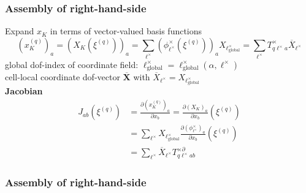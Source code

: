 \documentclass{beamer}
\begin{document}

\begin{frame}
  \frametitle{Assembly of right-hand-side}
  Expand $x_K$ in terms of vector-valued basis functions
$$
(x_K^{(q)})_a = (X_K(\xi^{(q)}))_a = \sum_{\ell^\times} (\phi^\times_{\ell^\times}(\xi^{(q)}))_a X_{\ell^\times_{\text{global}}} = \sum_{\ell^\times} T^\times_{q\ell^\times a} \overline{X}_{\ell^\times}
$$
global dof-index of coordinate field: $\ell^\times_{\text{global}}=\ell_{\text{global}}^\times(\alpha,\ell^\times)$\\
cell-local coordinate dof-vector $\overline{\boldsymbol{X}}$ with $\overline{X}_{\ell^\times} = X_{\ell_{\text{global}}^\times}$\\[2ex]
\textbf{Jacobian}
$$
\begin{aligned}
J_{ab}(\xi^{(q)}) &= \frac{\partial (x_K^{(q)})_a }{\partial x_b} = \frac{\partial (X_K)_a }{\partial x_b}(\xi^{(q)})\\
&= \sum_{\ell^\times} X_{\ell^\times_{\text{global}}} \frac{\partial (\phi^\times_{\ell^\times})_a }{\partial x_b}(\xi^{(q)})\\
&= \sum_{\ell^\times} \overline{X}_{\ell^\times} T^{\times\partial}_{q\ell^\times ab}
\end{aligned}
$$

\end{frame}


\begin{frame}
  \frametitle{Assembly of right-hand-side}
  \begin{algorithmic}[1]    
  \EndFor
\EndFor
\EndFor
  \end{algorithmic}
\end{frame}
\end{document}
